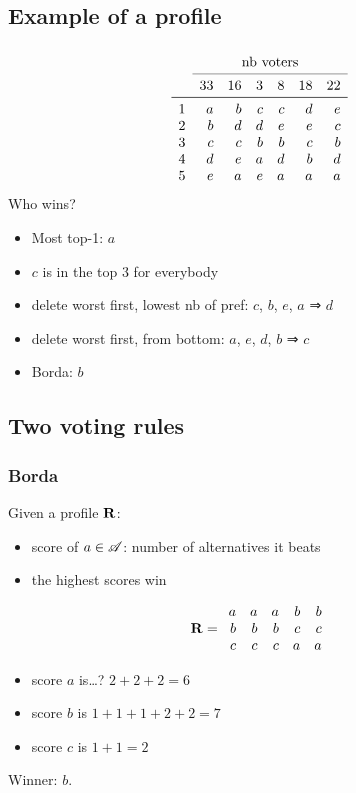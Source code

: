 \documentclass[french,english]{beamer}
\begin{document}
\subsection{Example of a profile}
\begin{frame}[fragile]
	\frametitle{\subsecname}
	\begin{equation}
		\begin{array}{lrrrrrr}
			&\multicolumn{6}{c}{\text{nb voters}}\\
		\cmidrule{2-7}
				&33	&16	&3	&8	&18	&22	\\
		\midrule
			1	&a	&b	&c	&c	&d	&e	\\
			2	&b	&d	&d	&e	&e	&c	\\
			3	&c	&c	&b	&b	&c	&b	\\
			4	&d	&e	&a	&d	&b	&d	\\
			5	&e	&a	&e	&a	&a	&a	\\
		\end{array}
	\end{equation}
	Who wins?\pause
	\begin{itemize}
		\item Most top-1: $a$
		\item $c$ is in the top 3 for everybody
		\item delete worst first, lowest nb of pref: $c$, $b$, $e$, $a$ ⇒ $d$
		\item delete worst first, from bottom: $a$, $e$, $d$, $b$ ⇒ $c$
		\item Borda: $b$
	\end{itemize}
\end{frame}

\subsection{Two voting rules}
\begin{frame}
	\frametitle{Borda}
	
Given a profile $\mathbf{R}$:
	\begin{itemize}
		\item score of $a \in \mathscr{A}$: number of alternatives it beats
		\item the highest scores win
	\end{itemize}
	
	\begin{equation}
		\mathbf{R} =
		\begin{array}{rrrrr}
			a	&	a	&	a	&	b	&	b\\
			b	&	b	&	b	&	c	&	c\\
			c	&	c	&	c	&	a	&	a
		\end{array}
	\end{equation}
	\begin{itemize}
		\item score $a$ is\dots? \pause $2 + 2 + 2 = 6$
		\item score $b$ is $1 + 1 + 1 + 2 + 2 = 7$
		\item score $c$ is $1 + 1 = 2$
	\end{itemize}
	Winner: $b$.
\end{frame}
\end{document}
